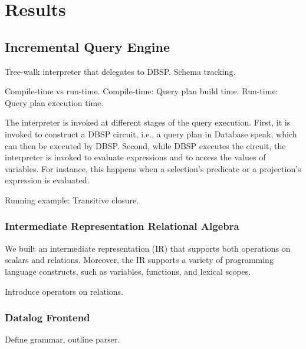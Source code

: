 
\chapter{Results}\label{ch:results}

\section{Incremental Query Engine}

Tree-walk interpreter that delegates to DBSP. Schema tracking.

Compile-time vs run-time.
Compile-time: Query plan build time.
Run-time: Query plan execution time.

The interpreter is invoked at different stages of the query execution.
First, it is invoked to construct a DBSP circuit, i.e., a query plan in
Database speak, which can then be executed by DBSP.
Second, while DBSP executes the circuit, the interpreter is invoked to
evaluate expressions and to access the values of variables. For instance,
this happens when a selection's predicate or a projection's expression
is evaluated.

Running example: Transitive closure.

\subsection{Intermediate Representation Relational Algebra}

We built an intermediate representation (IR) that supports both operations
on scalars and relations. Moreover, the IR supports a variety of programming
language constructs, such as variables, functions, and lexical scopes.

Introduce operators on relations.

\subsection{Datalog Frontend}

Define grammar, outline parser.

